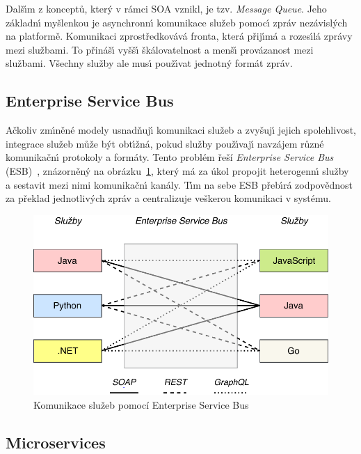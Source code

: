 Dalš\'{\i}m z konceptů, kter\'y v rámci \gls{SOA} vznikl, je tzv. \textit{Message Queue}.
Jeho základn\'{\i} myšlenkou je asynchronn\'{\i} komunikace služeb pomoc\'{\i} zpráv nezávisl\'ych
na platformě. Komunikaci zprostředkovává fronta, která přij\'{\i}má a rozes\'{\i}lá
zprávy mezi službami. To přináš\'{\i} vyšš\'{\i} škálovatelnost a menš\'{\i} provázanost
mezi službami. Všechny služby ale mus\'{\i} použ\'{\i}vat jednotn\'y formát zpráv.

\subsection{Enterprise Service Bus}

Ačkoliv zm\'{\i}něné modely usnadňuj\'{\i} komunikaci služeb a zvyšuj\'{\i} jejich
spolehlivost, integrace služeb může b\'yt obt\'{\i}žná, pokud služby použ\'{\i}vaj\'{\i}
navzájem různé komunikačn\'{\i} protokoly a formáty. Tento problém řeší \textit{Enterprise Service
Bus} (\gls{ESB})~\cite{chappell2004enterprise}, znázorněn\'y na obrázku~\ref{fig:enterprise-service-bus},
kter\'y má za úkol propojit heterogenn\'{\i} služby a sestavit mezi nimi komunikačn\'{\i} kanály.
T\'{\i}m na sebe \gls{ESB} přeb\'{\i}rá zodpovědnost za překlad jednotliv\'ych zpráv a centralizuje
veškerou komunikaci v systému.

\begin{figure}
    \centering
    \includegraphics[keepaspectratio=true, width=0.6\linewidth]{figures/enterprise-service-bus.pdf}
    \caption{Komunikace služeb pomocí Enterprise Service Bus}
    \label{fig:enterprise-service-bus}
\end{figure}

\subsection{Microservices}\label{sec:microservices}

